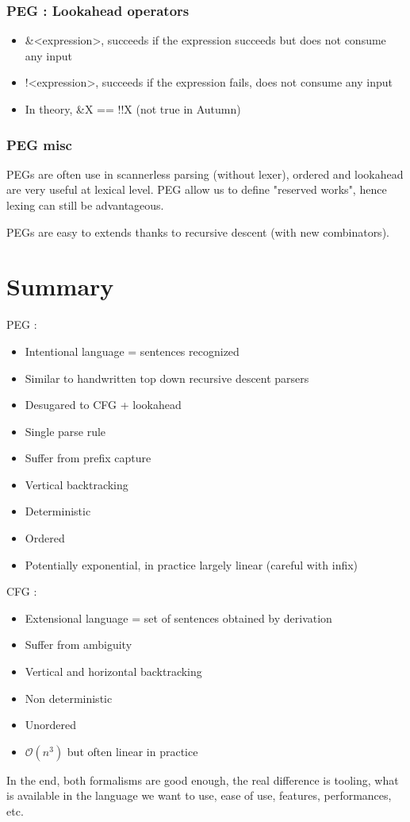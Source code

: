         \subsubsection{PEG : Lookahead operators}
            \begin{itemize}
                \item \&<expression>, succeeds if the expression succeeds but
                does not consume any input
                \item !<expression>, succeeds if the expression fails, does not
                consume any input
                \item In theory, \&X == !!X (not true in Autumn)
            \end{itemize}
        \subsubsection{PEG misc}
            PEGs are often use in scannerless parsing (without lexer), ordered
            and lookahead are very useful at lexical level. PEG allow us to
            define "reserved works", hence lexing can still be advantageous.

            PEGs are easy to extends thanks to recursive descent (with new
            combinators).
\section{Summary}
    PEG : 
        \begin{itemize}
            \item Intentional language = sentences recognized
            \item Similar to handwritten top down recursive descent parsers
            \item Desugared to CFG + lookahead
            \item Single parse rule
            \item Suffer from prefix capture
            \item Vertical backtracking
            \item Deterministic
            \item Ordered
            \item Potentially exponential, in practice largely linear (careful
            with infix)
        \end{itemize}
    CFG : 
        \begin{itemize}
            \item Extensional language = set of sentences obtained by derivation
            \item Suffer from ambiguity
            \item Vertical and horizontal backtracking
            \item Non deterministic
            \item Unordered
            \item $\mathcal{O}(n^3)$ but often linear in practice
        \end{itemize}
    In the end, both formalisms are good enough, the real difference is tooling,
    what is available in the language we want to use, ease of use, features,
    performances, etc.
            